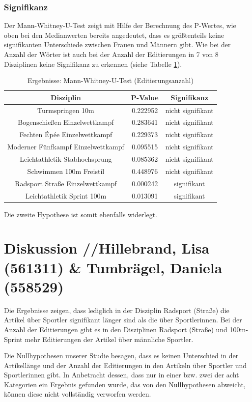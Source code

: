 \documentclass[11pt]{article}
\begin{document}
\subsubsection {Signifikanz}

Der Mann-Whitney-U-Test zeigt mit Hilfe der Berechnung des P-Wertes, wie oben bei den Medianwerten bereits angedeutet, dass es größtenteils keine signifikanten Unterschiede zwischen Frauen und Männern gibt. Wie bei der Anzahl der Wörter ist auch bei der Anzahl der Editierungen in 7 von 8 Disziplinen keine Signifikanz zu erkennen (siehe Tabelle \ref{tab:utest_edit}).

\begin{table}
\centering
\begin{tabular}{ c|c|c }
  Disziplin & P-Value & Signifikanz \\
  \hline
  Turmspringen 10m & 0.222952 & nicht signifikant \\
  Bogenschießen Einzelwettkampf & 0.283641 & nicht signifikant \\
  Fechten Épée Einzelwettkampf & 0.229373 & nicht signifikant \\
  Moderner Fünfkampf Einzelwettkampf & 0.095515 & nicht signifikant \\
  Leichtathletik Stabhochsprung & 0.085362 & nicht signifikant \\
  Schwimmen 100m Freistil & 0.448976 & nicht signifikant \\
  Radsport Straße Einzelwettkampf & 0.000242 & signifikant \\
  Leichtathletik Sprint 100m & 0.013091 & signifikant \\
\end{tabular}
\caption{\label{tab:utest_edit}Ergebnisse: Mann-Whitney-U-Test (Editierungsanzahl)}
\end{table}

Die zweite Hypothese ist somit ebenfalls widerlegt. 


\section {Diskussion //Hillebrand, Lisa (561311) \& Tumbrägel, Daniela (558529)}
Die Ergebnisse zeigen, dass lediglich in der Disziplin Radsport (Straße) die Artikel über Sportler signifikant länger sind als die über Sportlerinnen. Bei der Anzahl der Editierungen gibt es in den Disziplinen Radsport (Straße) und 100m-Sprint mehr Editierungen der Artikel über männliche Sportler.

Die Nullhypothesen unserer Studie besagen, dass es keinen Unterschied in der Artikellänge und der Anzahl der Editierungen in den Artikeln über Sportler und Sportlerinnen gibt. In Anbetracht dessen, dass nur in einer bzw. zwei der acht Kategorien ein Ergebnis gefunden wurde, das von den Nullhypothesen abweicht, können diese nicht vollständig verworfen werden.
\end{document}
